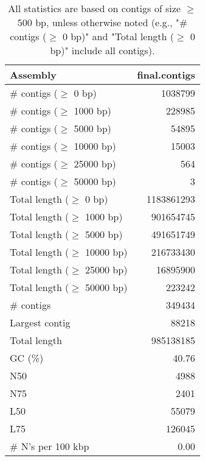 \documentclass[12pt,a4paper]{article}
\begin{document}
\begin{table}[ht]
\begin{center}
\caption{All statistics are based on contigs of size $\geq$ 500 bp, unless otherwise noted (e.g., "\# contigs ($\geq$ 0 bp)" and "Total length ($\geq$ 0 bp)" include all contigs).}
\begin{tabular}{|l*{1}{|r}|}
\hline
Assembly & final.contigs \\ \hline
\# contigs ($\geq$ 0 bp) & 1038799 \\ \hline
\# contigs ($\geq$ 1000 bp) & 228985 \\ \hline
\# contigs ($\geq$ 5000 bp) & 54895 \\ \hline
\# contigs ($\geq$ 10000 bp) & 15003 \\ \hline
\# contigs ($\geq$ 25000 bp) & 564 \\ \hline
\# contigs ($\geq$ 50000 bp) & 3 \\ \hline
Total length ($\geq$ 0 bp) & 1183861293 \\ \hline
Total length ($\geq$ 1000 bp) & 901654745 \\ \hline
Total length ($\geq$ 5000 bp) & 491651749 \\ \hline
Total length ($\geq$ 10000 bp) & 216733430 \\ \hline
Total length ($\geq$ 25000 bp) & 16895900 \\ \hline
Total length ($\geq$ 50000 bp) & 223242 \\ \hline
\# contigs & 349434 \\ \hline
Largest contig & 88218 \\ \hline
Total length & 985138185 \\ \hline
GC (\%) & 40.76 \\ \hline
N50 & 4988 \\ \hline
N75 & 2401 \\ \hline
L50 & 55079 \\ \hline
L75 & 126045 \\ \hline
\# N's per 100 kbp & 0.00 \\ \hline
\end{tabular}
\end{center}
\end{table}
\end{document}

